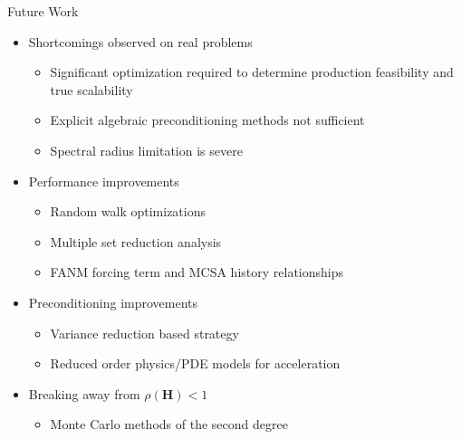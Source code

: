 \documentclass{beamer}
\begin{document}
\begin{frame}{Future Work}

  \begin{itemize}
  \item Shortcomings observed on real problems
    \begin{itemize}
    \item Significant optimization required to determine production
      feasibility and true scalability
    \item Explicit algebraic preconditioning methods not sufficient
    \item Spectral radius limitation is severe
    \end{itemize}
    \medskip
  \item Performance improvements
    \begin{itemize}
    \item Random walk optimizations
    \item Multiple set reduction analysis
    \item FANM forcing term and MCSA history relationships
    \end{itemize}
    \medskip
  \item Preconditioning improvements
    \begin{itemize}
    \item Variance reduction based strategy
    \item Reduced order physics/PDE models for acceleration
    \end{itemize}
    \medskip
  \item Breaking away from $\rho(\mathbf{H}) < 1$
    \begin{itemize}
    \item Monte Carlo methods of the second degree
    \end{itemize}
  \end{itemize}

\end{frame}
\end{document}
